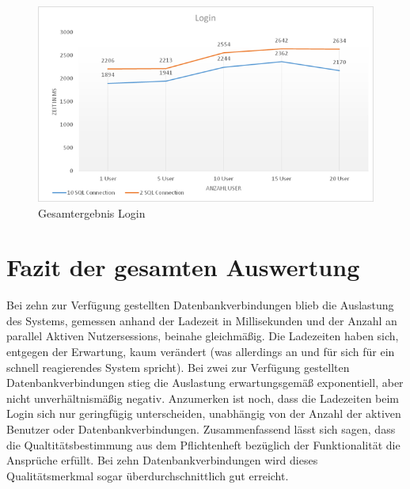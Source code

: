 \newpage

\begin{figure}[h]
\centering
\includegraphics[width=0.7\linewidth]{img/login}
\caption{Gesamtergebnis Login}
\label{fig:Login}
\end{figure}

\section{Fazit der gesamten Auswertung}

Bei zehn zur Verfügung gestellten Datenbankverbindungen blieb die Auslastung des Systems, gemessen anhand der Ladezeit in Millisekunden und der Anzahl an parallel Aktiven Nutzersessions, beinahe gleichmäßig. Die Ladezeiten haben sich, entgegen der Erwartung, kaum verändert (was allerdings an und für sich für ein schnell reagierendes System spricht).
Bei zwei zur Verfügung gestellten Datenbankverbindungen stieg die Auslastung erwartungsgemäß exponentiell, aber nicht unverhältnismäßig negativ.
Anzumerken ist noch, dass die Ladezeiten beim Login sich nur geringfügig unterscheiden, unabhängig von der Anzahl der aktiven Benutzer oder Datenbankverbindungen.
Zusammenfassend lässt sich sagen, dass die Qualtitätsbestimmung aus dem Pflichtenheft bezüglich der Funktionalität die Ansprüche erfüllt. Bei zehn Datenbankverbindungen wird dieses Qualitätsmerkmal sogar überdurchschnittlich gut erreicht.